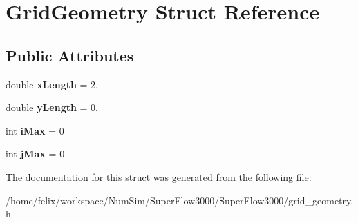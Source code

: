 \hypertarget{struct_grid_geometry}{\section{Grid\-Geometry Struct Reference}
\label{struct_grid_geometry}
}
\subsection*{Public Attributes}
\begin{DoxyCompactItemize}
\item 
\hypertarget{struct_grid_geometry_ab1da413b7690c1cdc79be904613b566d}{double {\bfseries x\-Length} = 2.}\label{struct_grid_geometry_ab1da413b7690c1cdc79be904613b566d}

\item 
\hypertarget{struct_grid_geometry_ac19c97706649774816ae1342ae906636}{double {\bfseries y\-Length} = 0.}\label{struct_grid_geometry_ac19c97706649774816ae1342ae906636}

\item 
\hypertarget{struct_grid_geometry_ae6f39244b8a883dd2e8342a34d167265}{int {\bfseries i\-Max} = 0}\label{struct_grid_geometry_ae6f39244b8a883dd2e8342a34d167265}

\item 
\hypertarget{struct_grid_geometry_aaf4abc571afda6106224a5cacb68b513}{int {\bfseries j\-Max} = 0}\label{struct_grid_geometry_aaf4abc571afda6106224a5cacb68b513}

\end{DoxyCompactItemize}


The documentation for this struct was generated from the following file\-:\begin{DoxyCompactItemize}
\item 
/home/felix/workspace/\-Num\-Sim/\-Super\-Flow3000/\-Super\-Flow3000/grid\-\_\-geometry.\-h\end{DoxyCompactItemize}
